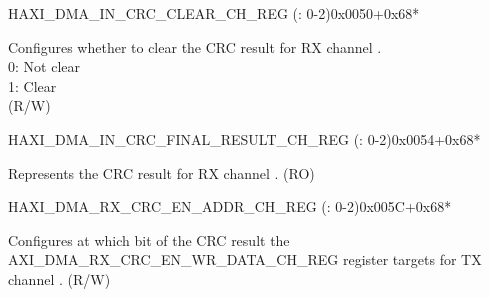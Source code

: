 \begin{register}{H}{AXI\_DMA\_IN\_CRC\_CLEAR\_CH\_REG (: 0-2)}{0x0050+0x68*}\label{regdesc:AXIDMAINCRCCLEARCHNREG}
%
%
\regnewline%
\begin{regdesc}\begin{reglist}
\label{fielddesc:AXIDMAINCRCCLEARCHNREG}\item [AXI\_DMA\_IN\_CRC\_CLEAR\_CH\regindex{n}\_REG] Configures whether to clear the CRC result for RX channel .\\
0: Not clear\\
1: Clear\\ (R/W)
\end{reglist}\end{regdesc}
\end{register}


\begin{register}{H}{AXI\_DMA\_IN\_CRC\_FINAL\_RESULT\_CH\_REG (: 0-2)}{0x0054+0x68*}\label{regdesc:AXIDMAINCRCFINALRESULTCHNREG}
%
\regnewline%
\begin{regdesc}\begin{reglist}
\label{fielddesc:AXIDMAINCRCFINALRESULTCHN}\item [AXI\_DMA\_IN\_CRC\_FINAL\_RESULT\_CH\regindex{n}] Represents the CRC result for RX channel . (RO)
\end{reglist}\end{regdesc}
\end{register}


\begin{register}{H}{AXI\_DMA\_RX\_CRC\_EN\_ADDR\_CH\_REG (: 0-2)}{0x005C+0x68*}\label{regdesc:AXIDMARXCRCENADDRCHNREG}
%
\regnewline%
\begin{regdesc}\begin{reglist}
\label{fielddesc:AXIDMARXCRCENADDRCHN}\item [AXI\_DMA\_RX\_CRC\_EN\_ADDR\_CH\regindex{n}] Configures at which bit of the CRC result the AXI\_DMA\_RX\_CRC\_EN\_WR\_DATA\_CH\_REG register targets for TX channel . (R/W)
\end{reglist}\end{regdesc}
\end{register}



